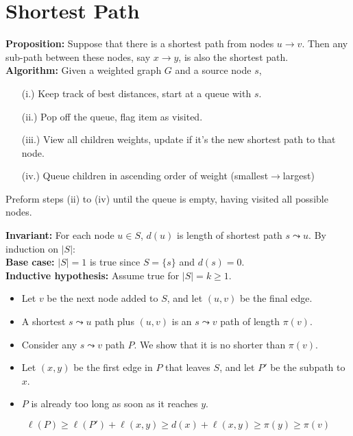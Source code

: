\vspace{-1.5em}
\section{Shortest Path}
\begin{theo}
    
    \textbf{Proposition:} Suppose that there is a shortest path from nodes $u\to v$. Then any
    sub-path between these nodes, say $x\to y$, is also the shortest path.\\

    \noindent
    \textbf{Algorithm:} Given a weighted graph $G$ and a source node $s$, 
    \begin{enumerate}
        \item [(i.)] Keep track of best distances, start at a queue with $s$.
        \item [(ii.)] Pop off the queue, flag item as visited.
        \item [(iii.)] View all children weights, update if it's the new shortest path to that node.
        \item [(iv.)] Queue children in ascending order of weight (smallest$\to$largest)
    \end{enumerate}
    Preform steps (ii) to (iv) until the queue is empty, having visited all possible nodes.
\end{theo}


\vspace{-1em}
\begin{Proof}

    \textbf{Invariant:} For each node $u \in S$, $d(u)$ is length of shortest path $s \leadsto u$. By induction on $|S|$:\\
    \textbf{Base case:} $|S| = 1$ is true since $S = \{s\}$ and $d(s) = 0$.\\
    \textbf{Inductive hypothesis:} Assume true for $|S| = k \geq 1$.
    \begin{itemize}
        \item Let $v$ be the next node added to $S$, and let $(u, v)$ be the final edge.
        \item A shortest $s \leadsto u$ path plus $(u, v)$ is an $s \leadsto v$ path of length $\pi(v)$.
        \item Consider any $s \leadsto v$ path $P$. We show that it is no shorter than $\pi(v)$.
        \item Let $(x, y)$ be the first edge in $P$ that leaves $S$, and let $P'$ be the subpath to $x$.
        \item $P$ is already too long as soon as it reaches $y$.
    \end{itemize}
    \[
    \ell(P) \geq \ell(P') + \ell(x, y) \geq d(x) + \ell(x, y) \geq \pi(y) \geq \pi(v)
    \]
    \end{Proof}
    
